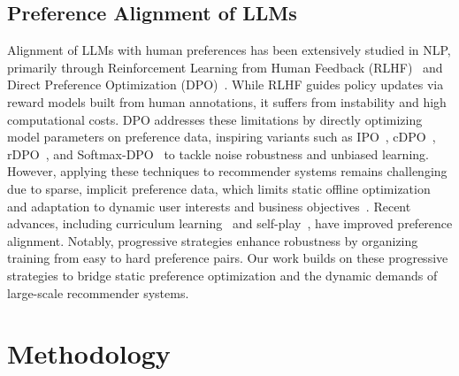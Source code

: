 \documentclass[letterpaper]{article} %
\begin{document}
\subsection{Preference Alignment of LLMs}
Alignment of LLMs with human preferences has been extensively studied in NLP, primarily through Reinforcement Learning from Human Feedback (RLHF)~\cite{rlhf2} and Direct Preference Optimization (DPO)~\cite{dpo}. While RLHF guides policy updates via reward models built from human annotations, it suffers from instability and high computational costs. DPO addresses these limitations by directly optimizing model parameters on preference data, inspiring variants such as IPO~\cite{ipo}, cDPO~\cite{cdpo}, rDPO~\cite{rdpo}, and Softmax-DPO~\cite{softmax-dpo} to tackle noise robustness and unbiased learning. However, applying these techniques to recommender systems remains challenging due to sparse, implicit preference data, which limits static offline optimization and adaptation to dynamic user interests and business objectives~\cite{onerec}. Recent advances, including curriculum learning~\cite{llara} and self-play~\cite{selfplay, spdpo}, have improved preference alignment. Notably, progressive strategies enhance robustness by organizing training from easy to hard preference pairs. 
Our work builds on these progressive strategies to bridge static preference optimization and the dynamic demands of large-scale recommender systems.
%

%
\section{Methodology}
\label{method}
\end{document}
